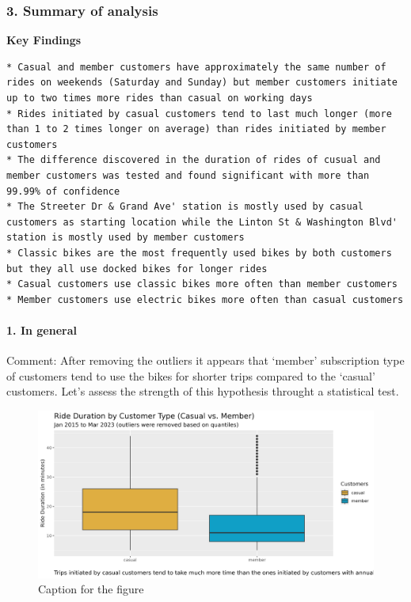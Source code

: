 \documentclass[
]{article}
\begin{document}
\hypertarget{summary-of-analysis}{%
\subsubsection{3. Summary of analysis}\label{summary-of-analysis}}

\textbf{Key Findings}

\begin{verbatim}
* Casual and member customers have approximately the same number of rides on weekends (Saturday and Sunday) but member customers initiate up to two times more rides than casual on working days
* Rides initiated by casual customers tend to last much longer (more than 1 to 2 times longer on average) than rides initiated by member customers
* The difference discovered in the duration of rides of cusual and member customers was tested and found significant with more than 99.99% of confidence
* The Streeter Dr & Grand Ave' station is mostly used by casual customers as starting location while the Linton St & Washington Blvd' station is mostly used by member customers
* Classic bikes are the most frequently used bikes by both customers but they all use docked bikes for longer rides
* Casual customers use classic bikes more often than member customers 
* Member customers use electric bikes more often than casual customers
\end{verbatim}

\hypertarget{in-general}{%
\paragraph{1. In general}\label{in-general}}

Comment: After removing the outliers it appears that `member'
subscription type of customers tend to use the bikes for shorter trips
compared to the `casual' customers. Let's assess the strength of this
hypothesis throught a statistical test.

\begin{figure}
\includegraphics[width=1\linewidth]{outputs/img/box_plots__ride_duration_by_customer_type} \caption{Caption for the figure}\label{fig:fig1}
\end{figure}
\end{document}
